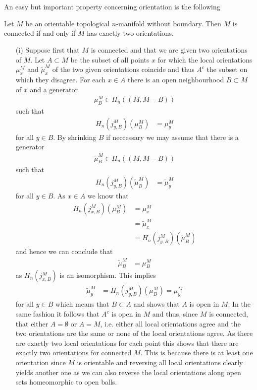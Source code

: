 \\\\
An easy but important property concerning orientation is the following
\\
\begin{thm}
\label{thm:connifftwoor}
Let $M$ be an orientable topological $n$-manifold without boundary. Then $M$ is connected if and only if $M$ has exactly two orientations.
\end{thm}
\begin{prf}
\begin{enumerate}
\item[(i)]
Suppose first that $M$ is connected and that we are given two orientations of $M$. Let $A \subset M$ be the subset of all points $x$ for which the local orientations $\mu_{x}^{M}$ and $\tilde{\mu}_{x}^{M}$ of the two given orientations coincide and thus $A^{c}$ the subset on which they disagree. For each $x \in A$ there is an open neighbourhood $B \subset M$ of $x$ and a generator
\begin{align*}
  \mu_{B}^{M}
  \in
  H_{n}((M,M - B))
\end{align*}
such that
\begin{align*}
  H_{n}(j_{y,B}^{M})(\mu_{B}^{M})
  &=
  \mu_{y}^{M}
\end{align*}
for all $y \in B$. By shrinking $B$ if neccessary we may assume that there is a generator
\begin{align*}
\tilde{\mu}_{B}^{M} \in H_{n}((M,M - B))
\end{align*}
such that
\begin{align*}
  H_{n}(j_{y,B}^{M})(\tilde{\mu}_{B}^{M})
  &=
  \tilde{\mu}_{y}^{M}
\end{align*}
for all $y \in B$. As $x \in A$ we know that
\begin{align*}
  H_{n}(j_{x,B}^{M})(\mu_{B}^{M})
  &=
  \mu_{x}^{M}
  \\
  &=
  \tilde{\mu}_{x}^{M}
  \\
  &=
  H_{n}(j_{y,B}^{M})(\tilde{\mu}_{B}^{M})
\end{align*}
and hence we can conclude that
\begin{align*}
  \tilde{\mu}_{B}^{M}
  &=
  \mu_{B}^{M}
\end{align*}
as $H_{n}(j_{x,B}^{M})$ is an isomorphism. This implies
\begin{align*}
  \tilde{\mu}_{y}^{M}
  &=
  H_{n}(j_{y,B}^{M})(\mu_{B}^{M})
  =
  \mu_{y}^{M}
\end{align*}
for all $y \in B$ which means that $B \subset A$ and shows that $A$ is open in $M$. In the same fashion it follows that $A^{c}$ is open in $M$ and thus, since $M$ is connected, that either $A = \emptyset$ or $A = M$, i.e. either all local orientations agree and the two orientations are the same or none of the local orientations agree. As there are exactly two local orientations for each point this shows that there are exactly two orientations for connected $M$. This is because there is at least one orientation since $M$ is orientable and reversing all local orientations clearly yields another one as we can also reverse the local orientations along open sets homeomorphic to open balls.


\end{enumerate}
\end{prf}
